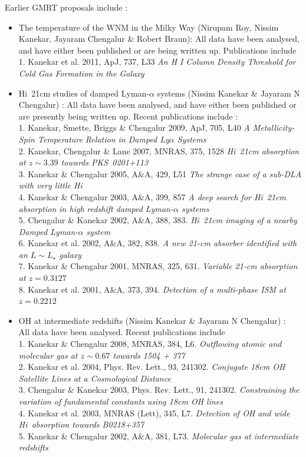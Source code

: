 \documentclass[11pt]{article}
\newcommand{\hi}{H{\sc i}}
\begin{document}
Earlier GMRT proposals include :
\begin{itemize}

\item{The temperature of the WNM in the Milky Way (Nirupam Roy, Nissim Kanekar, Jayaram Chengalur
\& Robert Braun):
All data have been analysed, and have either been published or are being written up. 
Publications include\\ 
1. Kanekar et al. 2011, ApJ, 737, L33 {\it An H I Column Density Threshold for Cold Gas Formation in the Galaxy}}

\item{\hi~21cm studies of damped Lyman-$\alpha$ systems (Nissim Kanekar \& Jayaram N Chengalur) :
All data have been analysed, and have either been published or are presently being
written up. Recent publications include :\\
1. Kanekar, Smette, Briggs \& Chengalur 2009, ApJ, 705, L40 {\it A Metallicity-Spin Temperature Relation in Damped Ly$\alpha$ Systems} \\
2. Kanekar, Chengalur \& Lane 2007, MNRAS, 375, 1528 {\it \hi~21cm absorption at $z \sim 3.39$ 
towards PKS~0201+113} \\
3. Kanekar \& Chengalur 2005, A\&A, 429, L51 {\it The strange case of a sub-DLA with very
little \hi}\\
4. Kanekar \& Chengalur 2003, A\&A, 399, 857 {\it A deep search for \hi~21cm absorption
in high redshift damped Lyman-$\alpha$ systems}\\
5. Chengalur \& Kanekar 2002, A\&A, 388, 383. {\it \hi~21cm imaging of a nearby
Damped Lyman-$\alpha$ system}\\
6. Kanekar et al. 2002, A\&A, 382, 838. {\it A new 21-cm absorber identified with
an $L \sim L_\star$ galaxy} \\
7. Kanekar \& Chengalur 2001, MNRAS, 325, 631. {\it Variable 21-cm absorption at
$z=0.3127$} \\
8. Kanekar et al. 2001, A\&A, 373, 394. {\it Detection of a multi-phase ISM at
$z= 0.2212$} }

\item{OH at intermediate redshifts (Nissim Kanekar \& Jayaram N Chengalur) : \\
All data have been analysed. Recent publications include\\
1. Kanekar \& Chengalur 2008, MNRAS, 384, L6. {\it Outflowing atomic and molecular gas at $z \sim 0.67$ towards 1504 + 377}\\
2. Kanekar et al. 2004, Phys. Rev. Lett., 93, 241302. {\it Conjugate 18cm OH Satellite Lines at a Cosmological Distance}\\
3. Chengalur \& Kanekar 2003, Phys. Rev. Lett., 91, 241302. {\it Constraining the variation
of fundamental constants using 18cm OH lines} \\
4. Kanekar et al. 2003, MNRAS (Lett), 345, L7. {\it Detection of OH and wide \hi\
absorption towards B0218+357} \\
5. Kanekar \& Chengalur 2002, A\&A, 381, L73. {\it Molecular gas at intermediate redshifts} }


\end{itemize}
\end{document}
